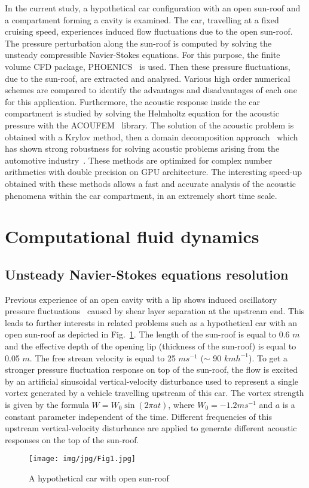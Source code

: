 \documentclass[10pt]{article}
\theoremstyle{plain}
\theoremstyle{definition}
\theoremstyle{remark}
\begin{document}
In the current study, a hypothetical car configuration with an open sun-roof and a compartment forming a cavity is examined.
The car, travelling at a fixed cruising speed, experiences induced flow fluctuations due to the open sun-roof.
The pressure perturbation along the sun-roof is computed by solving the unsteady compressible Navier-Stokes equations.
For this purpose, the finite volume CFD package, PHOENICS~\cite{phoenics2014} is used.
Then these pressure fluctuations, due to the sun-roof, are extracted and analysed.
Various high order numerical schemes are compared to identify the advantages and disadvantages of each one for this application.
Furthermore, the acoustic response inside the car compartment is studied by solving the Helmholtz equation for the acoustic pressure with the ACOUFEM~\cite{acoufem2014} library.
The solution of the acoustic problem is obtained with a Krylov method, then a domain decomposition approach~\cite{magoules:journal-auth:10,magoules:journal-auth:9} which has shown strong robustness for solving acoustic problems arising from the automotive industry~\cite{magoules:journal-auth:4}.
These methods are optimized for complex number arithmetics with double precision on GPU architecture.
The interesting speed-up obtained with these methods allows a fast and accurate analysis of the acoustic phenomena within the car compartment, in an extremely short time scale.


\section{Computational fluid dynamics}


\subsection{Unsteady Navier-Stokes equations resolution}

Previous experience of an open cavity with a lip shows induced oscillatory pressure fluctuations~\cite{Wang2008} caused by shear layer separation at the upstream end.
This leads to further interests in related problems such as a hypothetical car with an open sun-roof as depicted in Fig.~\ref{Fig1}.
The length of the sun-roof is equal to 0.6 $m$ and the effective depth of the opening lip (thickness of the sun-roof) is  equal to 0.05 $m$.
The free stream velocity is equal to 25 $m s^{-1}$ ($\sim$ 90 $km h^{-1}$).
To get a stronger pressure fluctuation response on top of the sun-roof, the flow is excited by an artificial sinusoidal vertical-velocity disturbance used to represent a single vortex generated by a vehicle travelling upstream of this car.
The vortex strength is given by the formula $W = W_0 \sin(2 \pi a t)$, where $W_0 = -1.2 m s^{-1}$ and $a$ is a constant parameter independent of the time.
Different frequencies of this upstream vertical-velocity disturbance are applied to generate different acoustic responses on the top of the sun-roof.
%
\begin{figure}[htbp]
\centering
\texttt{[image: img/jpg/Fig1.jpg]}
\caption{A hypothetical car with open sun-roof}\label{Fig1}
\end{figure}
%
\end{document}
